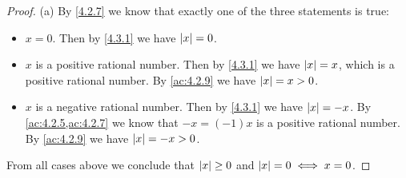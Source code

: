 \begin{proof}{(a)}
  By \cref{4.2.7} we know that exactly one of the three statements is true:
  \begin{itemize}
    \item \(x = 0\).
          Then by \cref{4.3.1} we have \(\left\lvert x\right\rvert = 0\).
    \item \(x\) is a positive rational number.
          Then by \cref{4.3.1} we have \(\left\lvert x\right\rvert = x\), which is a positive rational number.
          By \cref{ac:4.2.9} we have \(\left\lvert x\right\rvert = x > 0\).
    \item \(x\) is a negative rational number.
          Then by \cref{4.3.1} we have \(\left\lvert x\right\rvert = -x\).
          By \cref{ac:4.2.5,ac:4.2.7} we know that \(-x = (-1)x\) is a positive rational number.
          By \cref{ac:4.2.9} we have \(\left\lvert x\right\rvert = -x > 0\).
  \end{itemize}
  From all cases above we conclude that \(\left\lvert x\right\rvert \geq 0\) and \(\left\lvert x\right\rvert = 0 \iff x = 0\).
\end{proof}


